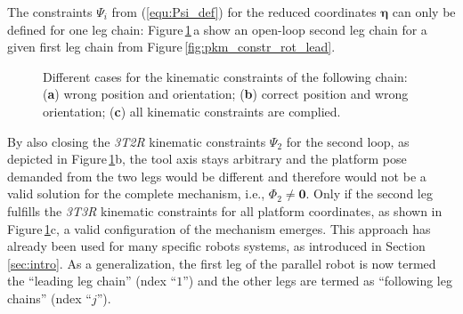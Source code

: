 \documentclass[robotics,article,accept,moreauthors,pdftex]{Definitions/mdpi}
\newcommand{\bm}[1]{\boldsymbol{#1}}
\let\Phi\varPhi
\let\Psi\varPsi
\begin{document}
The constraints $\bm{\Psi}_i$ from (\ref{equ:Psi_def}) for the reduced coordinates $\bm{\eta}$ can only be defined for one leg chain:
Figure\,\ref{fig:pkm_constr_rot_follow}\,a show an open-loop second leg chain for a given first leg chain from Figure\,\ref{fig:pkm_constr_rot_lead}.
%
\vspace{12pt}  %
\begin{figure}[b]
    \vspace{-0.5cm} %
    
    \caption{Different cases for the kinematic constraints of the following chain: (\textbf{a}) wrong position and orientation; (\textbf{b}) correct position and wrong orientation; (\textbf{c}) all kinematic constraints are complied.}
    \label{fig:pkm_constr_rot_follow}
\end{figure} 
%
By also closing the \emph{3T2R} kinematic constraints $\bm{\Psi}_2$ for the second loop, as depicted in Figure\,\ref{fig:pkm_constr_rot_follow}b, the tool axis stays arbitrary and the platform pose demanded from the two legs would be different and therefore would not be a valid solution for the complete mechanism, i.e., $\bm{\Phi}_2 \ne \bm{0}$.
Only if the second leg fulfills the \emph{3T3R} kinematic constraints for all platform coordinates, as shown in Figure\,\ref{fig:pkm_constr_rot_follow}c, a valid configuration of the mechanism emerges.
This approach has already been used for many specific robots systems, as introduced in Section\,\ref{sec:intro}.
As a generalization, the first leg of the parallel robot is now termed the ``leading leg chain'' (ndex ``$1$'') and the other legs are termed as ``following leg chains'' (ndex ``$j$'').
\end{document}
